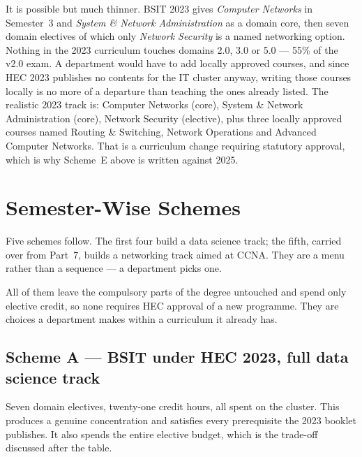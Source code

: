 \documentclass[11pt,a4paper,oneside]{report}
\begin{document}
\begin{notebox}
It is possible but much thinner. BSIT 2023 gives \emph{Computer Networks} in
Semester~3 and \emph{System \& Network Administration} as a domain core, then
seven domain electives of which only \emph{Network Security} is a named
networking option. Nothing in the 2023 curriculum touches domains 2.0, 3.0 or
5.0 --- 55\% of the v2.0 exam. A department would have to add locally approved
courses, and since HEC 2023 publishes no contents for the IT cluster anyway,
writing those courses locally is no more of a departure than teaching the ones
already listed. The realistic 2023 track is: Computer Networks (core), System \&
Network Administration (core), Network Security (elective), plus three locally
approved courses named Routing \& Switching, Network Operations and Advanced
Computer Networks. That is a curriculum change requiring statutory approval,
which is why Scheme~E above is written against 2025.
\end{notebox}

\section{Semester-Wise Schemes}

Five schemes follow. The first four build a data science track; the fifth,
carried over from Part~7, builds a networking track aimed at CCNA. They are a
menu rather than a sequence --- a department picks one.

All of them leave the compulsory parts of the degree untouched and spend only
elective credit, so none requires HEC approval of a new programme. They are
choices a department makes within a curriculum it already has.

\subsection{Scheme A --- BSIT under HEC 2023, full data science track}

Seven domain electives, twenty-one credit hours, all spent on the cluster. This
produces a genuine concentration and satisfies every prerequisite the 2023
booklet publishes. It also spends the entire elective budget, which is the
trade-off discussed after the table.
\end{document}

